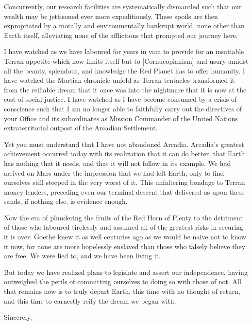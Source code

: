 Concurrently, our research facilities are systematically dismantled such that our wealth may be jettisoned ever more expeditiously. These spoils are then expropriated by a morally and environmentally bankrupt world, none other than Earth itself, alleviating none of the afflictions that prompted our journey here.

I have watched as we have laboured for years in vain to provide for an insatiable Terran appetite which now limits itself but to [Cornucopianism] and usury amidst all the beauty, splendour, and knowledge the Red Planet has to offer humanity. I have watched the Martian chronicle unfold as Terran tentacles transformed it from the reifiable dream that it once was into the nightmare that it is now at the cost of social justice. I have watched as I have become consumed by a crisis of conscience such that I am no longer able to faithfully carry out the directives of your Office and its subordinates as Mission Commander of the United Nations extraterritorial outpost of the Arcadian Settlement.

Yet you must understand that I have not abandoned Arcadia. Arcadia's greatest achievement occurred today with its realization that it can do better, that Earth has nothing that it needs, and that it will not follow in its example. We had arrived on Mars under the impression that we had left Earth, only to find ourselves still steeped in the very worst of it. This unfaltering bondage to Terran money lenders, preceding even our terminal descent that delivered us upon these sands, if nothing else, is evidence enough.

Now the era of plundering the fruits of the Red Horn of Plenty to the detriment of those who laboured tirelessly and assumed all of the greatest risks in securing it is over. Goethe knew it as well centuries ago as we would be naive not to know it now, for none are more hopelessly enslaved than those who falsely believe they are free. We were lied to, and we have been living it. 

But today we have realized plans to legislate and assert our independence, having outweighed the perils of committing ourselves to doing so with those of not. All that remains now is to truly depart Earth, this time with no thought of return, and this time to earnestly reify the dream we began with.

Sincerely, 


